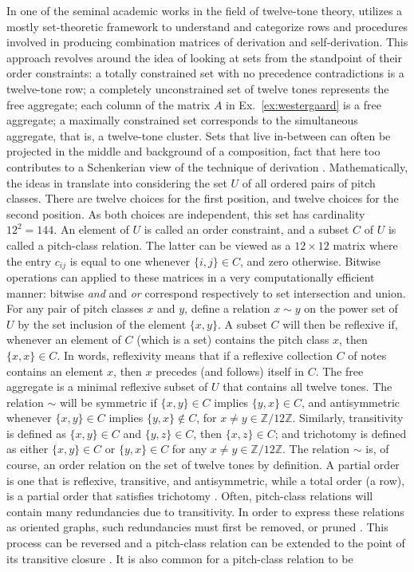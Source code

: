 In one of the seminal academic works in the field of twelve-tone theory, \cite{Starr1984} utilizes a mostly set-theoretic framework to understand and categorize rows and procedures involved in producing combination matrices of derivation and self-derivation. This approach revolves around the idea of looking at sets from the standpoint of their order constraints: a totally constrained set with no precedence contradictions is a twelve-tone row; a completely unconstrained set of twelve tones represents the free aggregate; each column of the matrix $A$ in Ex.~\ref{ex:westergaard} is a free aggregate; a maximally constrained set corresponds to the simultaneous aggregate, that is, a twelve-tone cluster. Sets that live in-between can often be projected in the middle and background of a composition, fact that here too contributes to a Schenkerian view of the technique of derivation \cite[183, 184]{Starr1984}. Mathematically, the ideas in \cite{Starr1984} translate into considering the set $U$ of all ordered pairs of pitch classes. There are twelve choices for the first position, and twelve choices for the second position. As both choices are independent, this set has cardinality $12^2 = 144$. An element of $U$ is called an order constraint, and a subset $C$ of $U$ is called a pitch-class relation. The latter can be viewed as a $12 \times 12$ matrix where the entry $c_{ij}$ is equal to one whenever $\{ i, j \} \in C$, and zero otherwise. Bitwise operations can applied to these matrices in a very computationally efficient manner: bitwise \emph{and} and \emph{or} correspond respectively to set intersection and union. For any pair of pitch classes $x$ and $y$, define a relation $x \sim y$ on the power set of $U$ by the set inclusion of the element $\{ x, y \}$. A subset $C$ will then be reflexive if, whenever an element of $C$ (which is a set) contains the pitch class $x$, then $\{ x, x \} \in C$. In words, reflexivity means that if a reflexive collection $C$ of notes contains an element $x$, then $x$ precedes (and follows) itself in $C$. The free aggregate is a minimal reflexive subset of $U$ that contains all twelve tones. The relation $\sim$ will be symmetric if $\{ x, y \} \in C$ implies $\{ y, x \} \in C$, and antisymmetric whenever $\{ x, y \} \in C$ implies $\{ y, x \} \notin C$, for $x \ne y \in \mathbb{Z}/ 12 \mathbb{Z}$. Similarly, transitivity is defined as $\{ x, y \} \in C$ and $\{ y, z \} \in C$, then $\{ x, z\} \in C$; and trichotomy is defined as either $\{ x, y \} \in C$ or $\{ y, x \} \in C$ for any $x \ne y \in \mathbb{Z}/ 12 \mathbb{Z}$. The relation $\sim$ is, of course, an order relation on the set of twelve tones by definition. A partial order is one that is reflexive, transitive, and antisymmetric, while a total order (a row), is a partial order that satisfies trichotomy \cite[184, 185]{Starr1984}. Often, pitch-class relations will contain many redundancies due to transitivity. In order to express these relations as oriented graphs, such redundancies must first be removed, or pruned \cite[186]{Starr1984}. This process can be reversed and a pitch-class relation can be extended to the point of its transitive closure \cite[190]{Starr1984}. It is also common for a pitch-class relation to be 
